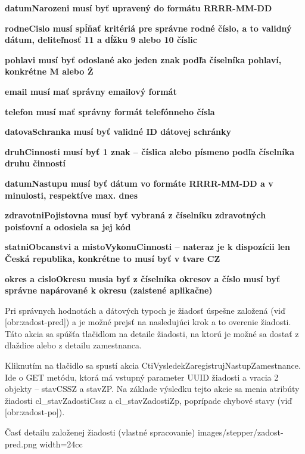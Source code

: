 \startitemize
\item{\start\bf datumNarozeni  \stop musí byť upravený do formátu RRRR-MM-DD} 
\item{\start\bf rodneCislo  \stop musí spĺňať kritériá pre správne rodné číslo, a to validný dátum, deliteľnosť 11 a dĺžku 9 alebo 10 číslic} 
\item{\start\bf pohlavi \stop musí byť odoslané ako jeden znak podľa číselníka pohlaví, konkrétne M alebo Ž} 
\item{\start\bf email \stop musí mať správny emailový formát}  
\item{\start\bf telefon \stop musí mať správny formát telefónneho čísla} 
\item{\start\bf datovaSchranka \stop musí byť validné ID dátovej schránky}  
\item{\start\bf druhCinnosti \stop musí byť 1 znak -- číslica alebo písmeno podľa číselníka druhu činností}  
\item{\start\bf datumNastupu \stop musí byť dátum vo formáte RRRR-MM-DD a v minulosti, respektíve max. dnes}  
\item{\start\bf zdravotniPojistovna \stop musí byť vybraná z číselníku zdravotných poisťovní a odosiela sa jej kód}  
\item{\start\bf statniObcanstvi a mistoVykonuCinnosti \stop -- nateraz je k dispozícii len Česká republika, konkrétne to musí byť v tvare CZ}  
\item{\start\bf okres a cisloOkresu \stop musia byť z číselníka okresov a číslo musí byť správne napárované k okresu (zaistené aplikačne)}  
\stopitemize



Pri správnych hodnotách a dátových typoch je žiadosť úspešne založená (viď [obr:zadost-pred]) a je možné prejsť na nasledujúci krok a to overenie žiadosti. Táto akcia sa spúšťa tlačidlom na detaile žiadosti, na ktorú je možné sa dostať z dlaždice alebo z detailu zamestnanca. 

Kliknutím na tlačidlo  sa spustí akcia CtiVysledekZaregistrujNastupZamestnance. Ide o GET metódu, ktorá má vstupný parameter UUID žiadosti a vracia 2 objekty -- stavCSSZ a stavZP. Na základe výsledku tejto akcie sa menia atribúty žiadosti cl_stavZadostiCssz a cl_stavZadostiZp, poprípade chybové stavy (viď [obr:zadost-po]).

{Časť detailu založenej žiadosti (vlastné spracovanie)}
{images/stepper/zadost-pred.png}
{width=24cc}


